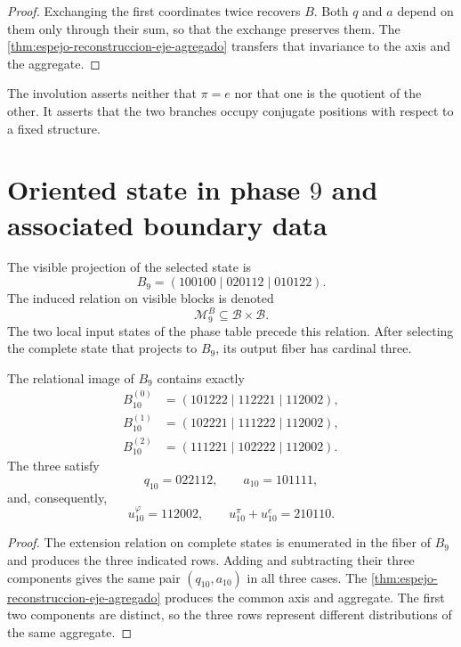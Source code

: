\begin{proof}
Exchanging the first coordinates twice recovers \(B\). Both
\(q\) and \(a\) depend on them only through their sum, so that the
exchange preserves them. The \cref{thm:espejo-reconstruccion-eje-agregado}
transfers that invariance to the axis and the aggregate.
\end{proof}

The involution asserts neither that \(\pi=e\) nor that one is the quotient of the other.
It asserts that the two branches occupy conjugate positions with respect to a
fixed structure.

\section{Oriented state in phase \(9\) and associated boundary data}

The visible projection of the selected state is
\[
 B_9=(100100\mid020112\mid010122).
\]
The induced relation on visible blocks is denoted
\[
 \mathcal M_9^B\subseteq\mathcal B\times\mathcal B.
\]
The two local input states of the phase table precede this
relation. After selecting the complete state that projects to \(B_9\), its
output fiber has cardinal three.

\begin{theorem}
\label{thm:espejo-tres-extensiones}
The relational image of \(B_9\) contains exactly
\begin{align*}
B_{10}^{(0)}&=(101222\mid112221\mid112002),\\
B_{10}^{(1)}&=(102221\mid111222\mid112002),\\
B_{10}^{(2)}&=(111221\mid102222\mid112002).
\end{align*}
The three satisfy
\[
 q_{10}=022112,
 \qquad
 a_{10}=101111,
\]
and, consequently,
\[
 u_{10}^\varphi=112002,
 \qquad
 u_{10}^\pi+u_{10}^e=210110.
\]
\end{theorem}

\begin{proof}
The extension relation on complete states is enumerated in the fiber of
\(B_9\) and produces the three indicated rows. Adding and subtracting their three
components gives the same pair \((q_{10},a_{10})\) in all three cases. The
\cref{thm:espejo-reconstruccion-eje-agregado} produces the common axis and
aggregate. The first two components are distinct, so the three
rows represent different distributions of the same aggregate.
\end{proof}

